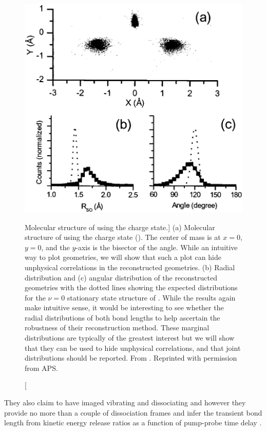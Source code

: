 \begin{figure}
  \centering
  \includegraphics[width=\textwidth]{gfx/LegareSO2-232Structure}
  \caption
  [Molecular structure of  using the  charge state.]
  {(a) Molecular structure of  using the  charge state (). The center of mass is at $x=0$, $y=0$, and the $y$-axis is the bisector of the angle. While an intuitive way to plot geometries, we will show that such a plot can hide unphysical correlations in the reconstructed geometries. (b) Radial distribution and (c) angular distribution of the reconstructed geometries with the dotted lines showing the expected distributions for the $\nu=0$ stationary state structure of . While the results again make intuitive sense, it would be interesting to see whether the radial distributions of both bond lengths to help ascertain the robustness of their reconstruction method. These marginal distributions are typically of the greatest interest but we will show that they can be used to hide unphysical correlations, and that joint distributions should be reported. From \citet{Legare05structure}. Reprinted with permission from APS.}
  \label{fig:SO2-232structure}
\end{figure}

They also claim to have imaged vibrating  and dissociating  and  however they provide no more than a couple of dissociation frames and infer the transient  bond length from kinetic energy release ratios as a function of pump-probe time delay \citep{Legare05dynamics}.

